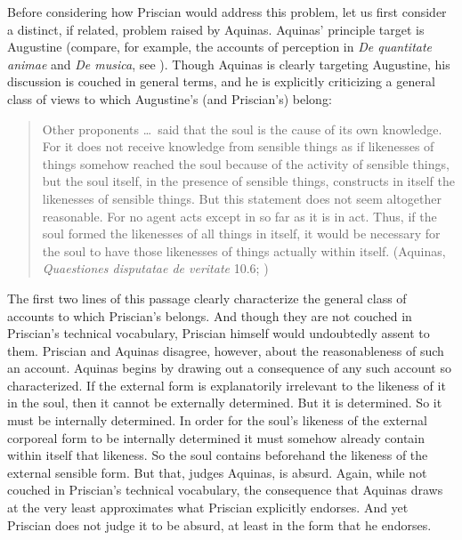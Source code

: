 \documentclass[12pt]{article}
\begin{document}
Before considering how Priscian would address this problem, let us first consider a distinct, if related, problem raised by Aquinas. Aquinas' principle target is Augustine (compare, for example, the accounts of perception in \emph{De quantitate animae} and \emph{De musica}, see \citealt[208--210, n.73]{Colleran:1949ys}). Though Aquinas is clearly targeting Augustine, his discussion is couched in general terms, and he is explicitly criticizing a general class of views to which Augustine's (and Priscian's) belong:
\begin{quote}
	Other proponents \ldots\ said that the soul is the cause of its own knowledge. For it does not receive knowledge from sensible things as if likenesses of things somehow reached the soul because of the activity of sensible things, but the soul itself, in the presence of sensible things, constructs in itself the likenesses of sensible things. But this statement does not seem altogether reasonable. For no agent acts except in so far as it is in act. Thus, if the soul formed the likenesses of all things in itself, it would be necessary for the soul to have those likenesses of things actually within itself. (Aquinas, \emph{Quaestiones disputatae de veritate} 10.6; \citealt[24]{James-V.-McGlynn:1953rz})
\end{quote}
The first two lines of this passage clearly characterize the general class of accounts to which Priscian's belongs. And though they are not couched in Priscian's technical vocabulary, Priscian himself would undoubtedly assent to them. Priscian and Aquinas disagree, however, about the reasonableness of such an account. Aquinas begins by drawing out a consequence of any such account so characterized. If the external form is explanatorily irrelevant to the likeness of it in the soul, then it cannot be externally determined. But it is determined. So it must be internally determined. In order for the soul's likeness of the external corporeal form to be internally determined it must somehow already contain within itself that likeness. So the soul contains beforehand the likeness of the external sensible form. But that, judges Aquinas, is absurd. Again, while not couched in Priscian's technical vocabulary, the consequence that Aquinas draws at the very least approximates what Priscian explicitly endorses. And yet Priscian does not judge it to be absurd, at least in the form that he endorses.
\end{document}
